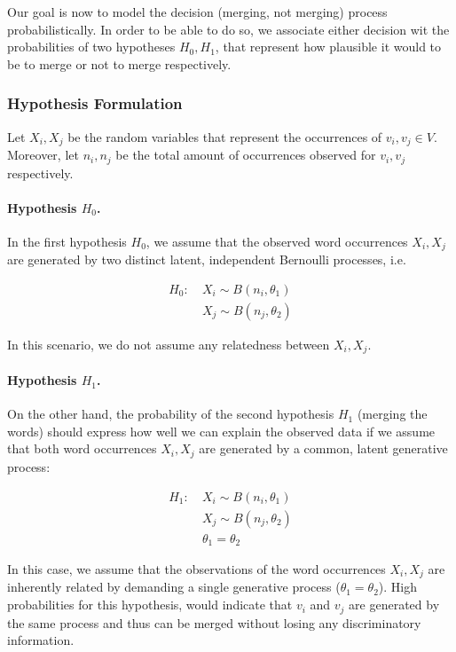 Our goal is now to model the decision (merging, not merging) process
probabilistically.
In order to be able to do so, we associate either decision wit the probabilities
of two hypotheses $H_0, H_1$, that represent how plausible it would to be 
to merge or not to merge respectively.

\subsubsection{Hypothesis Formulation}
 
 Let $X_i, X_j$ be the random variables that represent the occurrences
 of $v_i, v_j \in V$. Moreover, let $n_i, n_j$ be the total amount of occurrences
 observed for $v_i, v_j$ respectively. 
 
\paragraph{Hypothesis $H_0$.} In the first hypothesis $H_0$, we assume that the
observed word occurrences $X_i, X_j$ are generated by two distinct latent,
independent Bernoulli processes, i.e.

\begin{equation*}
\begin{split}
	H_0: &~X_i \sim B(n_i, \theta_1) \\
	     &~X_j \sim B(n_j, \theta_2)
\end{split}
\end{equation*}

In this scenario, we do not assume any relatedness between $X_i, X_j$. 

\paragraph{Hypothesis $H_1$.} On the other hand, the probability of the second
hypothesis $H_1$ (merging the words) should express how well we can explain
the observed data if we assume that both word occurrences $X_i, X_j$ are generated by a common,
latent generative process:

\begin{equation*}
\begin{split}
H_1: &~X_i \sim B(n_i, \theta_1) \\
	 &~X_j \sim B(n_j, \theta_2) \\
	 &~ \theta_1 = \theta_2
\end{split}
\end{equation*}

In this case, we assume that the observations of the word occurrences $X_i, X_j$
are inherently related by demanding a single generative
process ($\theta_1 = \theta_2$). High probabilities for this
hypothesis, would indicate that $v_i$ and $v_j$ are generated by the same
process and thus can be merged without losing any discriminatory information.

